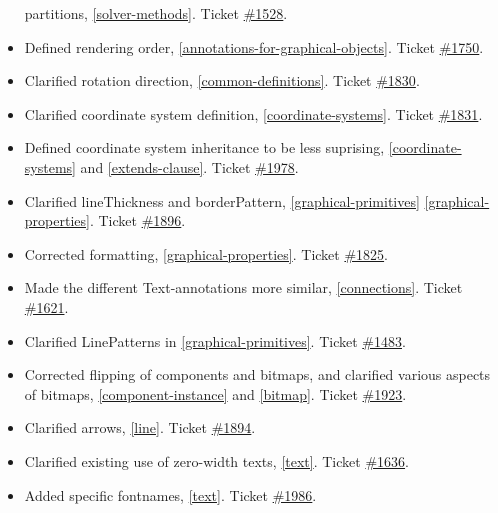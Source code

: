 \begin{itemize}
  partitions, \autoref{solver-methods}. Ticket
  \href{https://github.com/modelica/ModelicaSpecification/issues/1528}{\#1528}.
\item
  Defined rendering order, \autoref{annotations-for-graphical-objects}. Ticket
  \href{https://github.com/modelica/ModelicaSpecification/issues/1750}{\#1750}.
\item
  Clarified rotation direction, \autoref{common-definitions}. Ticket
  \href{https://github.com/modelica/ModelicaSpecification/issues/1830}{\#1830}.
\item
  Clarified coordinate system definition, \autoref{coordinate-systems}. Ticket
  \href{https://github.com/modelica/ModelicaSpecification/issues/1831}{\#1831}.
\item
  Defined coordinate system inheritance to be less suprising,
  \autoref{coordinate-systems} and \autoref{extends-clause}. Ticket
  \href{https://github.com/modelica/ModelicaSpecification/issues/1978}{\#1978}.
\item
  Clarified lineThickness and borderPattern, \autoref{graphical-primitives} \autoref{graphical-properties}.
  Ticket \href{https://github.com/modelica/ModelicaSpecification/issues/1896}{\#1896}.
\item
  Corrected formatting, \autoref{graphical-properties}. Ticket
  \href{https://github.com/modelica/ModelicaSpecification/issues/1825}{\#1825}.
\item
  Made the different Text-annotations more similar, \autoref{connections}.
  Ticket \href{https://github.com/modelica/ModelicaSpecification/issues/1621}{\#1621}.
\item
  Clarified LinePatterns in \autoref{graphical-primitives}. Ticket
  \href{https://github.com/modelica/ModelicaSpecification/issues/1483}{\#1483}.
\item
  Corrected flipping of components and bitmaps, and clarified various
  aspects of bitmaps, \autoref{component-instance} and \autoref{bitmap}. Ticket
  \href{https://github.com/modelica/ModelicaSpecification/issues/1923}{\#1923}.
\item
  Clarified arrows, \autoref{line}. Ticket
  \href{https://github.com/modelica/ModelicaSpecification/issues/1894}{\#1894}.
\item
  Clarified existing use of zero-width texts, \autoref{text}. Ticket
  \href{https://github.com/modelica/ModelicaSpecification/issues/1636}{\#1636}.
\item
  Added specific fontnames, \autoref{text}. Ticket
  \href{https://github.com/modelica/ModelicaSpecification/issues/1986}{\#1986}.

\end{itemize}
